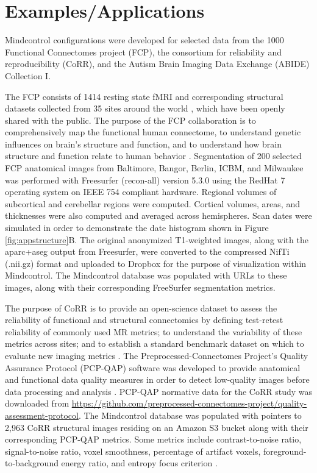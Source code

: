 \section{Examples/Applications}

Mindcontrol configurations were developed for selected data from the 1000 Functional Connectomes project (FCP), the consortium for reliability and reproducibility (CoRR), and the Autism Brain Imaging Data Exchange (ABIDE) Collection I. 

The FCP consists of 1414 resting state fMRI and corresponding structural datasets collected from 35 sites around the world  \cite{biswal2010toward}, which have been openly shared with the public. The purpose of the FCP collaboration is to comprehensively map the functional human connectome, to understand genetic influences on brain's structure and function, and to understand how brain structure and function relate to human behavior \cite{biswal2010toward}. Segmentation of 200 selected FCP anatomical images from Baltimore, Bangor, Berlin, ICBM, and Milwaukee was performed with Freesurfer (recon-all) version 5.3.0 \cite{fischl2002whole} using the RedHat 7 operating system on IEEE 754 compliant hardware. Regional volumes of  subcortical and cerebellar regions were computed. Cortical volumes, areas, and thicknesses were also computed and averaged across hemispheres. Scan dates were simulated in order to demonstrate the date histogram shown in Figure \ref{fig:appstructure}B. The original anonymized T1-weighted images, along with the aparc+aseg output from Freesurfer, were converted to the compressed NifTi (.nii.gz) format and uploaded to Dropbox for the purpose of visualization within Mindcontrol. The Mindcontrol database was populated with URLs to these images, along with their corresponding FreeSurfer segmentation metrics.

The purpose of CoRR is to provide an open-science dataset to assess the reliability of functional and structural connectomics by defining test-retest reliability of commonly used MR metrics; to understand the variability of these metrics across sites; and to establish a standard benchmark dataset on which to evaluate new imaging metrics \cite{Zuo_2014}. The Preprocessed-Connectomes Project's Quality Assurance Protocol (PCP-QAP) software was developed to provide anatomical and functional data quality measures in order to detect low-quality images before data processing and analysis \cite{shehzadpreprocessed}. PCP-QAP normative data for the CoRR study was downloaded from \href{http://raw.githubusercontent.com/preprocessed-connectomes-project/quality-assessment-protocol/master/poster_data/corr_anat.csv}{https://github.com/preprocessed-connectomes-project/quality-assessment-protocol}. The Mindcontrol database was populated with pointers to 2,963 CoRR structural images residing on an Amazon S3 bucket along with their corresponding PCP-QAP metrics. Some metrics include contrast-to-noise ratio, signal-to-noise ratio, voxel smoothness, percentage of artifact voxels, foreground-to-background energy ratio, and entropy focus criterion \cite{shehzadpreprocessed}. 

